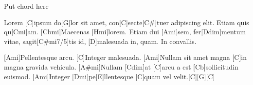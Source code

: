 

Put chord here

\guitarOn
[Ami]Lorem [C]ipsum do[G]lor sit amet,
con[C]secte[C#]tuer adipiscing elit.
Etiam quis qu[Cmi]am. [Cbmi]Maecenas [Hmi]lorem.
Etiam dui [Ami]sem, fer[Ddim]mentum vitae,
sagit[C#mi7/5]tis id, [D]malesuada in, quam. In convallis.

[Ami]Pellentesque arcu. [C]Integer malesuada.
[Ami]Nullam sit amet magna [C]in magna gravida vehicula.
[A#mi]Nullam [Cdim]at [C]arcu a est [Cb]sollicitudin euismod.
[Ami]Integer [Dmi]pe[E]llentesque [C]quam vel velit.[C][G][C]
\guitarOff

\bye
